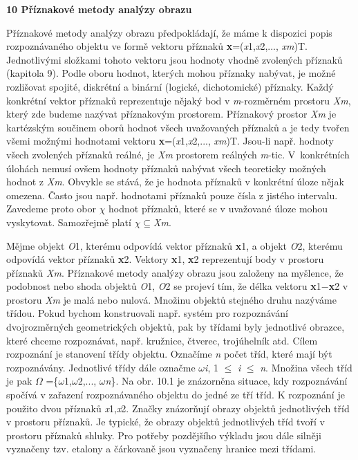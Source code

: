 \noindent \textbf{10  Příznakové metody analýzy obrazu}

\noindent Příznakové metody analýzy obrazu předpokládají, že máme k dispozici popis rozpoznávaného objektu ve formě vektoru příznaků \textbf{x}=(\textit{x}1,\textit{x}2,..., \textit{xm})T. Jednotlivými složkami tohoto vektoru jsou hodnoty vhodně zvolených příznaků (kapitola 9). Podle oboru hodnot, kterých mohou příznaky nabývat, je možné rozlišovat spojité, diskrétní a binární (logické, dichotomické) příznaky. Každý konkrétní vektor příznaků reprezentuje nějaký bod v \textit{m}-rozměrném prostoru \textit{Xm}, který zde budeme nazývat příznakovým prostorem. Příznakový prostor \textit{Xm} je kartézským součinem oborů hodnot všech uvažovaných příznaků a je tedy tvořen všemi možnými hodnotami vektoru \textbf{x}=(\textit{x}1,\textit{x}2,..., \textit{xm})T. Jsou-li např. hodnoty všech zvolených příznaků reálné, je \textit{Xm} prostorem reálných \textit{m}-tic. V~konkrétních úlohách nemusí ovšem hodnoty příznaků nabývat všech teoreticky možných hodnot z \textit{Xm}. Obvykle se stává, že je hodnota příznaků v konkrétní úloze nějak omezena. Často jsou např. hodnotami příznaků pouze čísla z jistého intervalu. Zavedeme proto obor $\chi$ hodnot příznaků, které se v uvažované úloze mohou vyskytovat. Samozřejmě platí $\chi$$\subseteq$\textit{Xm}.

\noindent 

\noindent Mějme objekt \textit{O}1, kterému odpovídá vektor příznaků \textbf{x}1, a objekt \textit{O}2, kterému odpovídá vektor příznaků \textbf{x}2. Vektory \textbf{x}1, \textbf{x}2 reprezentují body v prostoru příznaků \textit{Xm}. Příznakové metody analýzy obrazu jsou založeny na myšlence, že podobnost nebo shoda objektů \textit{O}1, \textit{O}2 se projeví tím, že délka vektoru \textbf{x}1$-$\textbf{x}2 v prostoru  \textit{Xm}  je malá nebo nulová. Množinu objektů stejného druhu nazýváme třídou. Pokud bychom konstruovali např. systém pro rozpoznávání dvojrozměrných geometrických objektů, pak by třídami byly jednotlivé obrazce, které chceme rozpoznávat, např. kružnice, čtverec, trojúhelník atd. Cílem rozpoznání je stanovení třídy objektu. Označíme \textit{n} počet tříd, které mají být rozpoznávány. Jednotlivé třídy dále označme $\omega$\textit{i}, 1 $\leq$ \textit{i} $\leq$ \textit{n}. Množina všech tříd je pak $\Omega$ =\{$\omega$1,$\omega$2,..., $\omega$\textit{n}\}. Na obr. 10.1 je znázorněna situace, kdy rozpoznávání spočívá v zařazení rozpoznávaného objektu do jedné ze tří tříd. K rozpoznání je použito dvou příznaků \textit{x}1,\textit{x}2. Značky znázorňují obrazy objektů jednotlivých tříd v prostoru příznaků. Je typické, že obrazy objektů jednotlivých tříd tvoří v prostoru příznaků shluky. Pro potřeby pozdějšího výkladu jsou dále silněji vyznačeny tzv. etalony a čárkovaně jsou vyznačeny hranice mezi třídami.

